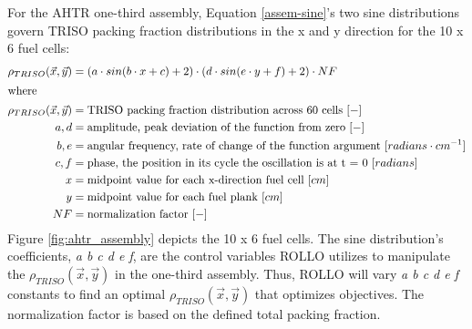 For the \gls{AHTR} one-third assembly, Equation \ref{assem-sine}'s two sine 
distributions govern \gls{TRISO} packing fraction distributions in the x and y direction 
for the 10 x 6 fuel cells:
\begin{align}
    \label{assem-sine}
    \rho_{TRISO}(\vec{x}, \vec{y}) &= \left(a\cdot sin(b\cdot x + c) + 2\right) 
    \cdot \left(d\cdot sin(e\cdot y + f) + 2\right) \cdot NF \\
    \intertext{where}
    \rho_{TRISO}(\vec{x}, \vec{y}) &= \mbox{TRISO packing fraction distribution across 60 cells } [-] \nonumber \\ 
    a, d &= \mbox{amplitude, peak deviation of the function from zero } [-] \nonumber \\
    b, e &= \mbox{angular frequency, rate of change of the function argument } [radians \cdot cm^{-1}] \nonumber \\
    c, f &= \mbox{phase, the position in its cycle the oscillation is at t = 0 } [radians]\nonumber \\
    x &= \mbox{midpoint value for each x-direction fuel cell } [cm]\nonumber \\
    y &= \mbox{midpoint value for each fuel plank } [cm]\nonumber \\
    NF &= \mbox{normalization factor } [-]\nonumber
\end{align}
Figure \ref{fig:ahtr_assembly} depicts the 10 x 6 fuel cells.
The sine distribution's coefficients, \textit{a b c d e f}, are the control variables 
\gls{ROLLO} utilizes to manipulate the $\rho_{TRISO}(\vec{x}, \vec{y})$ in the 
one-third assembly.
Thus, \gls{ROLLO} will vary \textit{a b c d e f} constants to find an optimal 
$\rho_{TRISO}(\vec{x}, \vec{y})$ that optimizes objectives.
The normalization factor is based on the defined total packing fraction.


